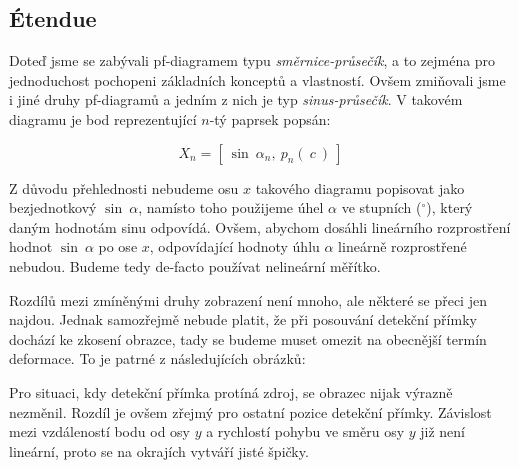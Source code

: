 

\subsection{Étendue}

Doteď jsme se zabývali pf-diagramem typu \emph{směrnice-průsečík}, a to zejména pro jednoduchost pochopeni základních konceptů a vlastností. Ovšem zmiňovali jsme i jiné druhy pf-diagramů a jedním z nich je typ \emph{sinus-průsečík}. V takovém diagramu je bod reprezentující $n$-tý paprsek popsán:

\[ X_n = [\ \sin\ \alpha_n,\ p_n(\ c\ )\ ] \]

Z důvodu přehlednosti nebudeme osu $x$ takového diagramu popisovat jako bezjednotkový $\sin\ \alpha$, namísto toho použijeme úhel $\alpha$ ve stupních ($^{\circ}$), který daným hodnotám sinu odpovídá. Ovšem, abychom dosáhli lineárního rozprostření hodnot $\sin\ \alpha$ po ose $x$, odpovídající hodnoty úhlu $\alpha$ lineárně rozprostřené nebudou. Budeme tedy de-facto používat nelineární měřítko.

Rozdílů mezi zmíněnými druhy zobrazení není mnoho, ale některé se přeci jen najdou. Jednak samozřejmě nebude platit, že při posouvání detekční přímky dochází ke zkosení obrazce, tady se budeme muset omezit na obecnější termín deformace. To je patrné z následujících obrázků:


Pro situaci, kdy detekční přímka protíná zdroj, se obrazec nijak výrazně nezměnil. Rozdíl je ovšem zřejmý pro ostatní pozice detekční přímky. Závislost mezi vzdáleností bodu od osy $y$ a rychlostí pohybu ve směru osy $y$ již není lineární, proto se na okrajích vytváří jisté špičky.


